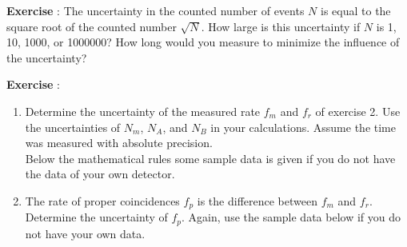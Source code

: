 \begin{shaded}
\textbf{Exercise \theExercise {}} : The uncertainty in the counted number of events $N$ is equal to the square root of the counted number $\sqrt{N}$. How large is this uncertainty if $N$ is 1, 10, 1000, or 1000000? How long would you measure to minimize the influence of the uncertainty?\end{shaded}

\begin{shaded}
\textbf{Exercise \theExercise {}} :
\begin{enumerate}[-]
\item Determine the uncertainty of the measured rate $f_m$ and $f_r$ of exercise 2. Use the uncertainties of $N_m$, $N_A$, and $N_B$ in your calculations. Assume the time was measured with absolute precision.\footnotemark \\
Below the mathematical rules some sample data is given if you do not have the data of your own detector.
\item The rate of proper coincidences $f_p$ is the difference between $f_m$ and $f_r$. Determine the uncertainty of $f_p$. Again, use the sample data below if you do not have your own data.
\end{enumerate}\end{shaded}



